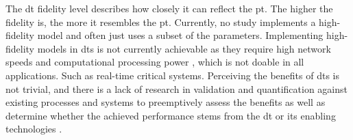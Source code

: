 The \ac{dt} fidelity level describes how closely it can reflect the \ac{pt}.
The higher the fidelity is, the more it resembles the \ac{pt}.
Currently, no study implements a high-fidelity model and often just uses a subset of the parameters.
Implementing high-fidelity models in \ac{dt}s is not currently achievable as they require high network speeds and computational processing power \cite{JONES202036}, which is not doable in all applications.
Such as real-time critical systems.
Perceiving the benefits of \ac{dt}s is not trivial, and there is a lack of research in validation and quantification against existing processes and systems to preemptively assess the benefits as well as determine whether the achieved performance stems from the \ac{dt} or its enabling technologies \cite{JONES202036, VANDINTER2022107008}.




 

 
